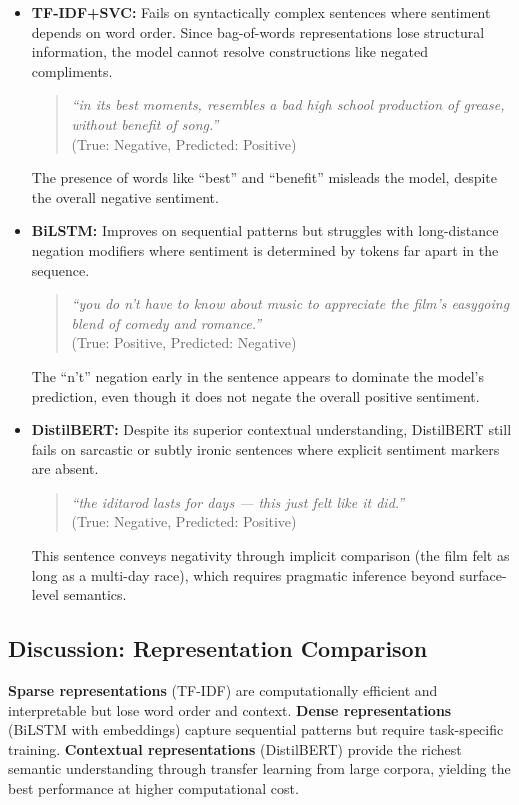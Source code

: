 \documentclass[12pt, a4paper]{article}
\begin{document}
\begin{itemize}
    \item \textbf{TF-IDF+SVC:} Fails on syntactically complex sentences where sentiment depends on word order. Since bag-of-words representations lose structural information, the model cannot resolve constructions like negated compliments.
    \begin{quote}
    \small \textit{``in its best moments, resembles a bad high school production of grease, without benefit of song.''} \\(True: Negative, Predicted: Positive)
    \end{quote}
    The presence of words like ``best'' and ``benefit'' misleads the model, despite the overall negative sentiment.

    \item \textbf{BiLSTM:} Improves on sequential patterns but struggles with long-distance negation modifiers where sentiment is determined by tokens far apart in the sequence.
    \begin{quote}
    \small \textit{``you do n't have to know about music to appreciate the film's easygoing blend of comedy and romance.''} \\(True: Positive, Predicted: Negative)
    \end{quote}
    The ``n't'' negation early in the sentence appears to dominate the model's prediction, even though it does not negate the overall positive sentiment.

    \item \textbf{DistilBERT:} Despite its superior contextual understanding, DistilBERT still fails on sarcastic or subtly ironic sentences where explicit sentiment markers are absent.
    \begin{quote}
    \small \textit{``the iditarod lasts for days --- this just felt like it did.''} \\(True: Negative, Predicted: Positive)
    \end{quote}
    This sentence conveys negativity through implicit comparison (the film felt as long as a multi-day race), which requires pragmatic inference beyond surface-level semantics.
\end{itemize}

\subsection{Discussion: Representation Comparison}

\textbf{Sparse representations} (TF-IDF) are computationally efficient and interpretable but lose word order and context. \textbf{Dense representations} (BiLSTM with embeddings) capture sequential patterns but require task-specific training. \textbf{Contextual representations} (DistilBERT) provide the richest semantic understanding through transfer learning from large corpora, yielding the best performance at higher computational cost.
\end{document}
